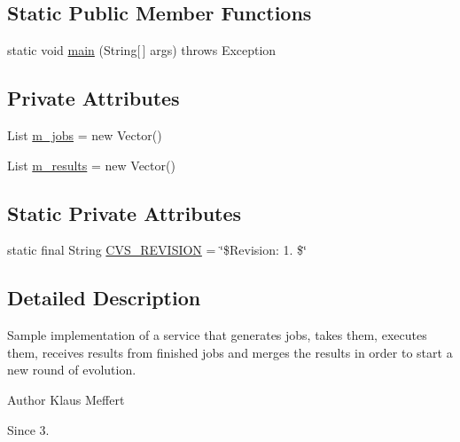 \subsection*{Static Public Member Functions}
\begin{DoxyCompactItemize}
\item 
static void \hyperlink{classorg_1_1jgap_1_1impl_1_1job_1_1_simple_job_consumer_ad9302e2bc0385ee7d83561e15876a366}{main} (String\mbox{[}$\,$\mbox{]} args)  throws Exception 
\end{DoxyCompactItemize}
\subsection*{Private Attributes}
\begin{DoxyCompactItemize}
\item 
List \hyperlink{classorg_1_1jgap_1_1impl_1_1job_1_1_simple_job_consumer_a37b72f0039fcfef98878a4118e1ba4ec}{m\-\_\-jobs} = new Vector()
\item 
List \hyperlink{classorg_1_1jgap_1_1impl_1_1job_1_1_simple_job_consumer_ace0170224c8d4aac738b5c737bd5e119}{m\-\_\-results} = new Vector()
\end{DoxyCompactItemize}
\subsection*{Static Private Attributes}
\begin{DoxyCompactItemize}
\item 
static final String \hyperlink{classorg_1_1jgap_1_1impl_1_1job_1_1_simple_job_consumer_a648c25b78d381e24952c7a1ce3e0e457}{C\-V\-S\-\_\-\-R\-E\-V\-I\-S\-I\-O\-N} = \char`\"{}\$Revision\-: 1. \$\char`\"{}
\end{DoxyCompactItemize}


\subsection{Detailed Description}
Sample implementation of a service that generates jobs, takes them, executes them, receives results from finished jobs and merges the results in order to start a new round of evolution.

\begin{DoxyAuthor}{Author}
Klaus Meffert 
\end{DoxyAuthor}
\begin{DoxySince}{Since}
3. 
\end{DoxySince}


